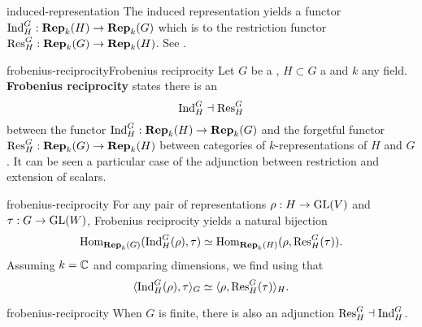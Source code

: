 \begin{example}{induced-representation}
    The induced representation yields a functor $\textup{Ind}_H^G : \textbf{Rep}_k(H) \to \textbf{Rep}_k(G)$ which is  to the restriction functor $\textup{Res}_H^G : \textbf{Rep}_k(G) \to \textbf{Rep}_k(H)$. See .
\end{example}

\begin{topic}{frobenius-reciprocity}{Frobenius reciprocity}
    Let $G$ be a , $H \subset G$ a  and $k$ any field. \textbf{Frobenius reciprocity} states there is an 
    \[ \textup{Ind}_H^G \dashv \textup{Res}_H^G \]
    between the  functor $\textup{Ind}_H^G : \textbf{Rep}_k(H) \to \textbf{Rep}_k(G)$ and the forgetful functor $\textup{Res}_H^G : \textbf{Rep}_k(G) \to \textbf{Rep}_k(H)$ between categories of $k$-representations of $H$ and $G$. It can be seen a particular case of the adjunction between restriction and extension of scalars.
\end{topic}

\begin{example}{frobenius-reciprocity}
    For any pair of representations $\rho : H \to \textup{GL}(V)$ and $\tau : G \to \textup{GL}(W)$, Frobenius reciprocity yields a natural bijection
    \[ \text{Hom}_{\textbf{Rep}_k(G)}(\textup{Ind}_H^G(\rho), \tau) \simeq \text{Hom}_{\textbf{Rep}_k(H)}(\rho, \textup{Res}_H^G(\tau)) . \]
    Assuming $k = \mathbb{C}$ and comparing dimensions, we find using  that
    \[ \langle \textup{Ind}_H^G(\rho), \tau \rangle_G \simeq \langle \rho, \textup{Res}_H^G(\tau) \rangle_H . \]
\end{example}

\begin{example}{frobenius-reciprocity}
    When $G$ is finite, there is also an adjunction $\textup{Res}_H^G \dashv \textup{Ind}_H^G$.
\end{example}

